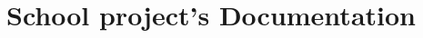 \documentclass{article}
\title{School project's Documentation}
\begin{document}
\maketitle

\begin{abstract}
    
\end{abstract}
\end{document}
